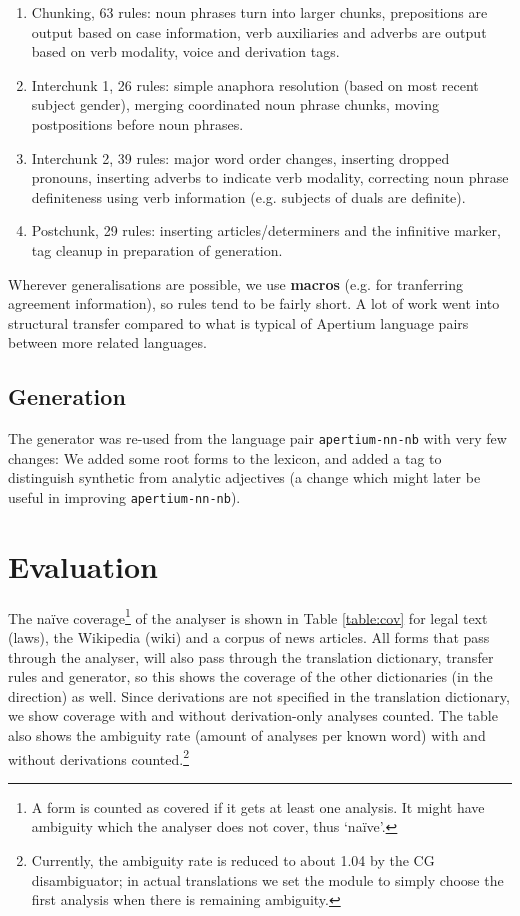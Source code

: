 \documentclass{book}
\begin{document}
\begin{enumerate}

\item Chunking, 63 rules: noun phrases turn into larger chunks,
  prepositions are output based on case information, verb auxiliaries
  and adverbs are output based on verb modality, voice and derivation
  tags.

\item Interchunk 1, 26 rules: simple anaphora resolution (based on
  most recent subject gender), merging coordinated noun phrase chunks,
  moving postpositions before noun phrases.

\item Interchunk 2, 39 rules: major word order changes, inserting
  dropped pronouns, inserting adverbs to indicate verb modality,
  correcting noun phrase definiteness using verb information (e.g.
  subjects of duals are definite).

\item Postchunk, 29 rules: inserting articles/determiners and the
  infinitive marker, tag cleanup in preparation of generation.
\end{enumerate}

Wherever generalisations are possible, we use \textbf{macros} (e.g.
for tranferring agreement information), so rules tend to be fairly
short. A lot of work went into structural transfer compared to what is
typical of Apertium language pairs between more related languages.

\subsection{Generation}
The generator was re-used from the language pair
\texttt{apertium-nn-nb} with very few changes: We added some root
forms to the lexicon, and added a tag to distinguish synthetic from analytic
adjectives (a change which might later be useful in improving
\texttt{apertium-nn-nb}).

\section{Evaluation}
\label{sec:eval}
The na\"{i}ve coverage\footnote{A form is counted as covered if it
  gets at least one analysis. It might have ambiguity which the
  analyser does not cover, thus `na\"{i}ve'.} of the analyser is shown
in Table \ref{table:cov} for legal text (laws), the \sme{} Wikipedia
(wiki) and a corpus of \sme{} news articles. All forms that pass
through the analyser, will also pass through the translation
dictionary, transfer rules and generator, so this shows the coverage
of the other dictionaries (in the \smenob{} direction) as well. Since
derivations are not specified in the translation dictionary, we show
coverage with and without derivation-only analyses counted. The table
also shows the ambiguity rate (amount of analyses per known word) with
and without derivations counted.\footnote{Currently, the ambiguity
  rate is reduced to about 1.04 by the CG disambiguator; in actual
  translations we set the module to simply choose the first analysis
  when there is remaining ambiguity.}
\end{document}
